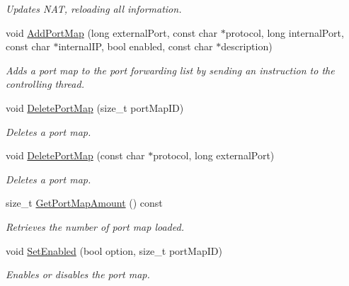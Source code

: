 \begin{DoxyCompactItemize}
\begin{DoxyCompactList}\small\item\em Updates NAT, reloading all information. \item\end{DoxyCompactList}\item 
void \hyperlink{class_upnp_nat_communication_a0b1c580bb0b02eb6b5d06ed453a89a50}{AddPortMap} (long externalPort, const char $\ast$protocol, long internalPort, const char $\ast$internalIP, bool enabled, const char $\ast$description)
\begin{DoxyCompactList}\small\item\em Adds a port map to the port forwarding list by sending an instruction to the controlling thread. \item\end{DoxyCompactList}\item 
void \hyperlink{class_upnp_nat_communication_a03852ca938bb87f61001278ac8377cc8}{DeletePortMap} (size\_\-t portMapID)
\begin{DoxyCompactList}\small\item\em Deletes a port map. \item\end{DoxyCompactList}\item 
void \hyperlink{class_upnp_nat_communication_a7f328a7379332d76facdab41d0c41d9d}{DeletePortMap} (const char $\ast$protocol, long externalPort)
\begin{DoxyCompactList}\small\item\em Deletes a port map. \item\end{DoxyCompactList}\item 
size\_\-t \hyperlink{class_upnp_nat_communication_a0943a5bc4f406962049d7461686c0c17}{GetPortMapAmount} () const 
\begin{DoxyCompactList}\small\item\em Retrieves the number of port map loaded. \item\end{DoxyCompactList}\item 
void \hyperlink{class_upnp_nat_communication_a922d852a18a45fe3f4258f7fa22c3ee7}{SetEnabled} (bool option, size\_\-t portMapID)
\begin{DoxyCompactList}\small\item\em Enables or disables the port map. \item\end{DoxyCompactList}\item 

\end{DoxyCompactItemize}
